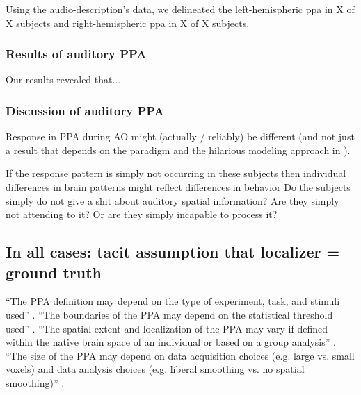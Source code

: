 Using the audio-description's data, \citet{haeusler2022processing} we delineated
the left-hemispheric \ac{ppa} in X of X subjects and right-hemispheric \ac{ppa}
in X of X subjects.


\subsubsection{Results of auditory PPA}

Our results revealed that...


\subsubsection{Discussion of auditory PPA}


%
Response in PPA during AO might (actually / reliably) be different (and not just
a result that depends on the paradigm and the hilarious modeling approach in
\citet{haeusler2022processing}).

%
If the response pattern is simply not occurring in these subjects then
individual differences in brain patterns might reflect differences in behavior
%
Do the subjects simply do not give a shit about auditory spatial information?
%
Are they simply not attending to it? Or are they simply incapable to process it?


\subsection{In all cases: tacit assumption that localizer = ground truth}



``The PPA definition may depend on the type of experiment, task, and stimuli
used'' \citet{weiner2018defining}.
%
``The boundaries of the PPA may depend on the statistical threshold used''
\citet{weiner2018defining}.
%
``The spatial extent and localization of the PPA may vary if defined within the
native brain space of an individual or based on a group analysis''
\citet{weiner2018defining}.
%
``The size of the PPA may depend on data acquisition choices (e.g. large vs.
small voxels) and data analysis choices (e.g. liberal smoothing vs. no spatial
smoothing)'' \citep{weiner2018defining}.


